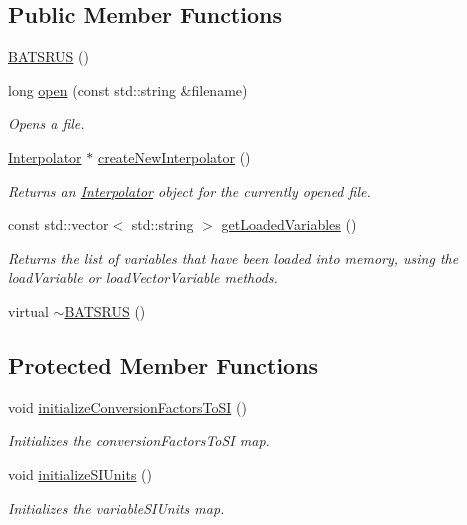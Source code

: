 \subsection*{Public Member Functions}
\begin{DoxyCompactItemize}
\item 
\hyperlink{classccmc_1_1_b_a_t_s_r_u_s_a687bb4cafb036eb5149d5d52be52037d}{B\-A\-T\-S\-R\-U\-S} ()
\item 
long \hyperlink{classccmc_1_1_b_a_t_s_r_u_s_a9acf9929698159533b7a50734665dd1a}{open} (const std\-::string \&filename)
\begin{DoxyCompactList}\small\item\em Opens a file.  \end{DoxyCompactList}\item 
\hyperlink{classccmc_1_1_interpolator}{Interpolator} $\ast$ \hyperlink{classccmc_1_1_b_a_t_s_r_u_s_a3cbd68c8c3fb850c3b10cb314c0a21b3}{create\-New\-Interpolator} ()
\begin{DoxyCompactList}\small\item\em Returns an \hyperlink{classccmc_1_1_interpolator}{Interpolator} object for the currently opened file.  \end{DoxyCompactList}\item 
const std\-::vector$<$ std\-::string $>$ \hyperlink{classccmc_1_1_b_a_t_s_r_u_s_a6886de3c29f43d4cb927cea05d43e50d}{get\-Loaded\-Variables} ()
\begin{DoxyCompactList}\small\item\em Returns the list of variables that have been loaded into memory, using the load\-Variable or load\-Vector\-Variable methods. \end{DoxyCompactList}\item 
virtual \hyperlink{classccmc_1_1_b_a_t_s_r_u_s_a087125c4f1ee6883206fd63bf8fb1528}{$\sim$\-B\-A\-T\-S\-R\-U\-S} ()
\end{DoxyCompactItemize}
\subsection*{Protected Member Functions}
\begin{DoxyCompactItemize}
\item 
void \hyperlink{classccmc_1_1_b_a_t_s_r_u_s_a86dddd02ea3db46068f482d59f77df86}{initialize\-Conversion\-Factors\-To\-S\-I} ()
\begin{DoxyCompactList}\small\item\em Initializes the conversion\-Factors\-To\-S\-I map.  \end{DoxyCompactList}\item 
void \hyperlink{classccmc_1_1_b_a_t_s_r_u_s_ab86a0088002795bbf4b60fd89576604e}{initialize\-S\-I\-Units} ()
\begin{DoxyCompactList}\small\item\em Initializes the variable\-S\-I\-Units map.  \end{DoxyCompactList}\end{DoxyCompactItemize}
